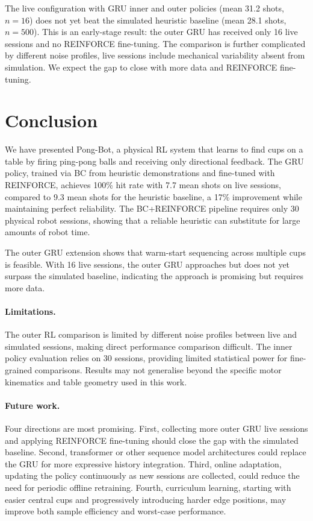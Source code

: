 \documentclass[twoside,11pt]{article}
\begin{document}
The live configuration with GRU inner and outer policies (mean 31.2 shots,
$n{=}16$) does not yet beat the simulated heuristic baseline (mean 28.1 shots,
$n{=}500$). This is an early-stage result: the outer GRU has received only 16
live sessions and no REINFORCE fine-tuning. The comparison is further
complicated by different noise profiles, live sessions include mechanical
variability absent from simulation. We expect the gap to close with more data
and REINFORCE fine-tuning.

\section{Conclusion}

We have presented Pong-Bot, a physical RL system that learns to find cups on a
table by firing ping-pong balls and receiving only directional feedback. The
GRU policy, trained via BC from heuristic demonstrations and fine-tuned with
REINFORCE, achieves 100\% hit rate with 7.7 mean shots on live sessions,
compared to 9.3 mean shots for the heuristic baseline, a 17\% improvement
while maintaining perfect reliability. The BC+REINFORCE pipeline requires only
30 physical robot sessions, showing that a reliable heuristic can substitute
for large amounts of robot time.

The outer GRU extension shows that warm-start sequencing across multiple cups
is feasible. With 16 live sessions, the outer GRU approaches but does not yet
surpass the simulated baseline, indicating the approach is promising but
requires more data.

\paragraph{Limitations.}
The outer RL comparison is limited by different noise profiles between live and
simulated sessions, making direct performance comparison difficult. The inner
policy evaluation relies on 30 sessions, providing limited statistical power
for fine-grained comparisons. Results may not generalise beyond the specific
motor kinematics and table geometry used in this work.

\paragraph{Future work.}
Four directions are most promising. First, collecting more outer GRU live
sessions and applying REINFORCE fine-tuning should close the gap with the
simulated baseline. Second, transformer or other sequence model architectures
could replace the GRU for more expressive history integration. Third, online
adaptation, updating the policy continuously as new sessions are collected,
could reduce the need for periodic offline retraining. Fourth, curriculum
learning, starting with easier central cups and progressively introducing
harder edge positions, may improve both sample efficiency and worst-case
performance.
\end{document}
